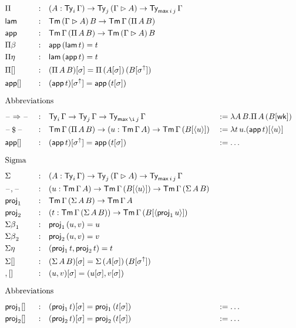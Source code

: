 \documentclass{article}
\begin{document}
\begin{alignat*}{5}
  & \Pi && : && (A:\Ty_i\,\Gamma)\ra\Ty_j\,(\Gamma\rhd A)\ra\Ty_{\max\,i\,j}\,\Gamma \\
  & \lam && : && \Tm\,(\Gamma\rhd A)\,B\ra\Tm\,\Gamma\,(\Pi\,A\,B) \\
  & \app && : && \Tm\,\Gamma\,(\Pi\,A\,B)\ra\Tm\,(\Gamma\rhd A)\,B \\
  & {\Pi\beta} && : && \app\,(\lam\,t) = t \\
  & {\Pi\eta} && : && \lam\,(\app\,t) = t \\
  & {\Pi[]} && : && (\Pi\,A\,B)[\sigma] = \Pi\,(A[\sigma])\,(B[\sigma^\uparrow]) \\
  & {\app[]} && : && (\app\,t)[\sigma^\uparrow] = \app\,(t[\sigma]) \\
  & \heading{Abbreviations} \\
  & \blank\Ra\blank && : && \Ty_i\,\Gamma\ra\Ty_j\,\Gamma\ra\Ty_{\max\,\i\,j}\,\Gamma && := \lambda A\,B.\Pi\,A\,(B[\wk]) \\
  & \blank\oldapp\blank && : && \Tm\,\Gamma\,(\Pi\,A\,B)\ra(u : \Tm\,\Gamma\,A)\ra\Tm\,\Gamma\,(B[\lb u\rb]) && := \lambda t\,u.(\app\,t)[\lb u \rb] \\
  & {\app[]} && : && (\app\,t)[\sigma^\uparrow] = \app\,(t[\sigma]) && := \dots \\
  & \heading{Sigma} \\
  & \Sigma && : && (A:\Ty_i\,\Gamma)\ra\Ty_j\,(\Gamma\rhd A)\ra\Ty_{\max\,i\,j}\,\Gamma \\
  & \blank,\blank && : && (u:\Tm\,\Gamma\,A)\ra\Tm\,\Gamma\,(B[\lb u\rb])\ra\Tm\,\Gamma\,(\Sigma\,A\,B) \\
  & \proj_1 && : && \Tm\,\Gamma\,(\Sigma\,A\,B)\ra\Tm\,\Gamma\,A \\
  & \proj_2 && : && (t:\Tm\,\Gamma\,(\Sigma\,A\,B))\ra\Tm\,\Gamma\,(B[\lb \proj_1\,u\rb]) \\
  & {\Sigma\beta}_1 && : && \proj_1\,(u,v) = u \\
  & {\Sigma\beta}_2 && : && \proj_2\,(u,v) = v \\
  & {\Sigma\eta} && : && (\proj_1\,t, \proj_2\,t) = t \\
  & {\Sigma[]} && : && (\Sigma\,A\,B)[\sigma] = \Sigma\,(A[\sigma])\,(B[\sigma^\uparrow]) \\
  & {,[]} && : && (u,v)[\sigma] = (u[\sigma], v[\sigma]) \\
  & \heading{Abbreviations} \\
  & {\proj_1[]} && : && (\proj_1\,t)[\sigma] = \proj_1\,(t[\sigma]) && := \dots \\
  & {\proj_2[]} && : && (\proj_2\,t)[\sigma] = \proj_2\,(t[\sigma]) && := \dots \\

\end{alignat*}
\end{document}
